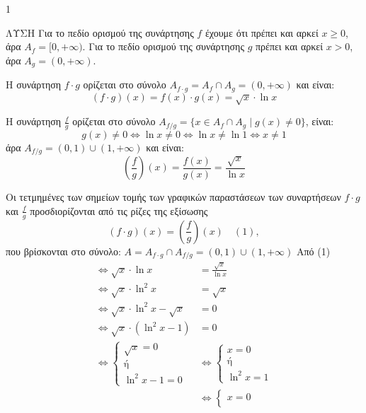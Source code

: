 \begin{ylh}{1}
    \item [Ύλη από εικόνα]
\end{ylh}
ΛΥΣΗ
Για το πεδίο ορισμού της συνάρτησης $f$ έχουμε ότι πρέπει και αρκεί $x \ge 0$, άρα $A_f = [0,+\infty)$.
Για το πεδίο ορισμού της συνάρτησης $g$ πρέπει και αρκεί $x > 0$, άρα $A_g = (0,+\infty)$.

\begin{alist}
\item Η συνάρτηση $f \cdot g$ ορίζεται στο σύνολο $A_{f \cdot g} = A_f \cap A_g = (0,+\infty)$ και είναι:
\[ (f \cdot g)(x) = f(x) \cdot g(x) = \sqrt{x} \cdot \ln x \]
\item Η συνάρτηση $\frac{f}{g}$ ορίζεται στο σύνολο $A_{f/g} = \{x \in A_f \cap A_g \mid g(x) \ne 0\}$, είναι:
\[ g(x) \ne 0 \Leftrightarrow \ln x \ne 0 \Leftrightarrow \ln x \ne \ln 1 \Leftrightarrow x \ne 1 \]
άρα $A_{f/g} = (0,1) \cup (1,+\infty)$ και είναι:
\[ \left(\frac{f}{g}\right)(x) = \frac{f(x)}{g(x)} = \frac{\sqrt{x}}{\ln x} \]
\item Οι τετμημένες των σημείων τομής των γραφικών παραστάσεων των συναρτήσεων $f \cdot g$ και $\frac{f}{g}$ προσδιορίζονται από τις ρίζες της εξίσωσης
\[ (f \cdot g)(x) = \left(\frac{f}{g}\right)(x) \quad (1), \]
που βρίσκονται στο σύνολο: $A = A_{f \cdot g} \cap A_{f/g} = (0,1) \cup (1,+\infty)$
Από (1)
\begin{align*}
    \Leftrightarrow \sqrt{x} \cdot \ln x &= \frac{\sqrt{x}}{\ln x} \\
    \Leftrightarrow \sqrt{x} \cdot \ln^2 x &= \sqrt{x} \\
    \Leftrightarrow \sqrt{x} \cdot \ln^2 x - \sqrt{x} &= 0 \\
    \Leftrightarrow \sqrt{x} \cdot (\ln^2 x - 1) &= 0 \\
    \Leftrightarrow \begin{cases}
        \sqrt{x} = 0 \\
        \text{ή} \\
        \ln^2 x - 1 = 0
    \end{cases}
    &\Leftrightarrow \begin{cases}
        x = 0 \\
        \text{ή} \\
        \ln^2 x = 1
    \end{cases} \\
    &\Leftrightarrow \begin{cases}
        x = 0 \\

\end{cases}
\end{align*}
\end{alist}
